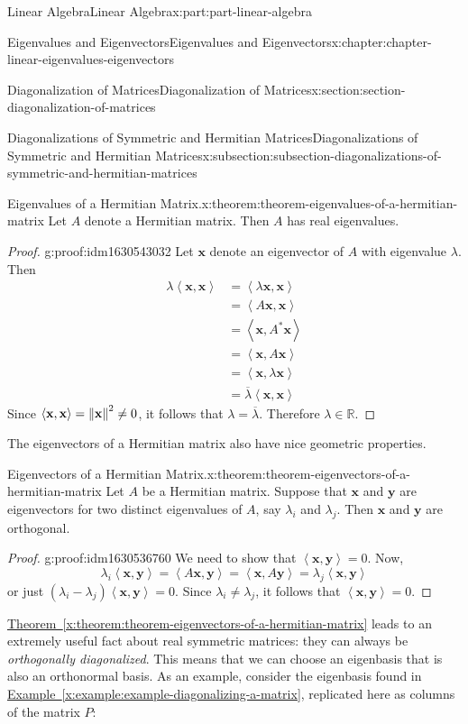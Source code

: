 \documentclass[twoside,10pt,]{book}
\newcommand{\xreffont}{\relax}
\numberwithin{equation}{part}
\newcommand{\RR}{\mathbb{R}}
\newcommand{\xx}{\mathbf{x}}
\newcommand{\yy}{\mathbf{y}}
\newcommand{\dotprod}[1]{\left\langle #1 \right\rangle}
\begin{document}
\begin{partptx}{Linear Algebra}{}{Linear Algebra}{}{}{x:part:part-linear-algebra}
\begin{chapterptx}{Eigenvalues and Eigenvectors}{}{Eigenvalues and Eigenvectors}{}{}{x:chapter:chapter-linear-eigenvalues-eigenvectors}
\begin{sectionptx}{Diagonalization of Matrices}{}{Diagonalization of Matrices}{}{}{x:section:section-diagonalization-of-matrices}
\begin{subsectionptx}{Diagonalizations of Symmetric and Hermitian Matrices}{}{Diagonalizations of Symmetric and Hermitian Matrices}{}{}{x:subsection:subsection-diagonalizations-of-symmetric-and-hermitian-matrices}
\begin{theorem}{Eigenvalues of a Hermitian Matrix.}{}{x:theorem:theorem-eigenvalues-of-a-hermitian-matrix}%
Let \(A\) denote a Hermitian matrix. Then \(A\) has real eigenvalues.%
\end{theorem}
\begin{proof}{}{g:proof:idm1630543032}
Let \(\xx\) denote an eigenvector of \(A\) with eigenvalue \(\lambda\). Then%
\begin{align*}
\lambda\dotprod{\xx,\xx} & = \dotprod{\lambda\xx,\xx} \\
& = \dotprod{A\xx,\xx} \\
& = \dotprod{\xx, A^*\xx} \\
& = \dotprod{\xx, A\xx} \\
& = \dotprod{\xx, \lambda \xx} \\
& = \overline{\lambda}\dotprod{\xx, \xx} 
\end{align*}
Since \(\dotprod{\xx,\xx} = \norm{\xx}^2\neq0\), it follows that \(\lambda = \overline{\lambda}\). Therefore \(\lambda\in\RR\).%
\end{proof}
The eigenvectors of a Hermitian matrix also have nice geometric properties.%
\begin{theorem}{Eigenvectors of a Hermitian Matrix.}{}{x:theorem:theorem-eigenvectors-of-a-hermitian-matrix}%
Let \(A\) be a Hermitian matrix. Suppose that \(\xx\) and \(\yy\) are eigenvectors for two distinct eigenvalues of \(A\), say \(\lambda_i\) and \(\lambda_j\). Then \(\xx\) and \(\yy\) are orthogonal.%
\end{theorem}
\begin{proof}{}{g:proof:idm1630536760}
We need to show that \(\dotprod{\xx,\yy} = 0\). Now,%
\begin{equation*}
\lambda_i\dotprod{\xx,\yy} = \dotprod{A\xx,\yy} = \dotprod{\xx,A\yy} = \lambda_j\dotprod{\xx,\yy}
\end{equation*}
or just \((\lambda_i-\lambda_j)\dotprod{\xx,\yy} = 0\). Since \(\lambda_i\neq \lambda_j\), it follows that \(\dotprod{\xx,\yy} = 0\).%
\end{proof}
\hyperref[x:theorem:theorem-eigenvectors-of-a-hermitian-matrix]{Theorem~{\xreffont\ref{x:theorem:theorem-eigenvectors-of-a-hermitian-matrix}}} leads to an extremely useful fact about real symmetric matrices: they can always be \emph{orthogonally diagonalized}. This means that we can choose an eigenbasis that is also an orthonormal basis. As an example, consider the eigenbasis found in \hyperref[x:example:example-diagonalizing-a-matrix]{Example~{\xreffont\ref{x:example:example-diagonalizing-a-matrix}}}, replicated here as columns of the matrix \(P\):%

\end{subsectionptx}
\end{sectionptx}
\end{chapterptx}
\end{partptx}
\end{document}
